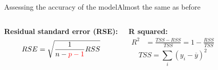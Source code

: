 \documentclass[aspectratio=169,usenames,dvipsnames]{beamer}
\newcommand{\InstructorNotes}[1]{\textit{\color{orange}#1}}
\newcommand{\InstructorList}[1]{
\begin{itemize}
	\color{orange}
	#1
\end{itemize}
}
\renewcommand{\InstructorNotes}[1]{}
\renewcommand{\InstructorList}[1]{}
\begin{document}
\begin{frame}[c]{Assessing the accuracy of the model}{Almost the same as before}
	\centering
\begin{columns}
\textbf{Residual standard error (RSE):}
\begin{align*}
	RSE &= \sqrt{ \frac{1}{n-{\color{red}p-1}} RSS}\\
\end{align*}
\InstructorNotes{measure lack of fit; }




\textbf{R squared:}
\begin{align*}
	R^2 &= \frac{TSS-RSS}{TSS} = 1-\frac{RSS}{TSS}
\end{align*}
\begin{equation*}
	TSS = \sum_i (y_i - \overline y)^2
\end{equation*}
\InstructorList{
\item Proportion in [0,1]; variability in $Y$ that can be explained using $X$
\item 0 means $Y$ not explained by linear regression on $X$}
\end{columns}

\end{frame}

\end{document}
